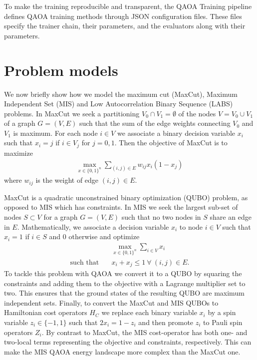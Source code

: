 \documentclass[twocolumn,
english,
aps,
pra,
10pt,
longbibliography,
superscriptaddress,
amsmath,
amssymb,
floatfix
]{revtex4-2}
\begin{document}
{To make the training reproducible and transparent, the QAOA Training pipeline defines QAOA training methods through JSON configuration files. 
These files specify the trainer chain, their parameters, and the evaluators along with their parameters. 

\section{Problem models\label{app:problem_models}}

We now briefly show how we model the maximum cut (MaxCut), Maximum Independent Set (MIS) and Low Autocorrelation Binary Sequence (LABS) problems.
In MaxCut we seek a partitioning $V_0\cap V_1=\emptyset
$ of the nodes $V=V_0\cup V_1$ of a graph $G=(V, E)$ such that the sum of the edge weights connecting $V_0$ and $V_1$ is maximum.
For each node $i\in V$ we associate a binary decision variable $x_i$ such that $x_i=j$ if $i\in V_j$ for $j=0,1$.
Then the objective of MaxCut is to maximize
\begin{align}\label{eqn:max_cut}
    \max_{x\in\{0, 1\}^n}\sum_{(i,j)\in E} w_{ij} x_i(1-x_j)
\end{align}
where $w_{ij}$ is the weight of edge $(i,j)\in E$.

MaxCut is a quadratic unconstrained binary optimization (QUBO) problem, as opposed to MIS which has constraints.
In MIS we seek the largest sub-set of nodes $S\subset V$ for a graph $G=(V, E)$ such that no two nodes in $S$ share an edge in $E$.
Mathematically, we associate a decision variable $x_i$ to node $i\in V$ such that $x_i=1$ if $i\in S$ and $0$ otherwise and optimize
\begin{align}\label{eqn:mis1}
    & \max_{x\in\{0, 1\}^n}\sum_{i\in V}x_i \\
    \text{such that}\quad & x_i+x_j\leq 1~\forall~(i,j)\in E. \label{eqn:mis2}
\end{align}
To tackle this problem with QAOA we convert it to a QUBO by squaring the constraints and adding them to the objective with a Lagrange multiplier set to two.
This ensures that the ground states of the resulting QUBO are maximum independent sets.
Finally, to convert the MaxCut and MIS QUBOs to Hamiltonian cost operators $H_C$ we replace each binary variable $x_i$ by a spin variable $z_i\in\{-1, 1\}$ such that $2x_i=1-z_i$ and then promote $z_i$ to Pauli spin operators $Z_i$.
By contrast to MaxCut, the MIS cost-operator has both one- and two-local terms representing the objective and constraints, respectively.
This can make the MIS QAOA energy landscape more complex than the MaxCut one.

}
\end{document}
